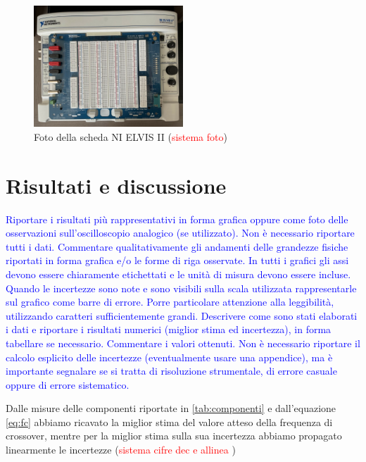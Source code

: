 \documentclass[12pt,italian]{article}
\newcommand{\prof}[1]{\textcolor{blue}{#1}}
\newcommand{\err}[1]{\textcolor{red}{#1}}
\begin{document}
\begin{figure}[h]
	\centering
	\includegraphics[width=0.5\textwidth]{Images/Elvis.jpg}
	\caption{Foto della scheda NI ELVIS II (\err{sistema foto})}
	\label{fig:Elvis}
\end{figure}

\section*{Risultati e discussione}
\prof{ Riportare i risultati più rappresentativi in forma grafica oppure come
	foto delle osservazioni sull'oscilloscopio analogico (se utilizzato). Non è
	necessario riportare tutti i dati. Commentare qualitativamente gli andamenti
	delle grandezze fisiche riportati in forma grafica e/o le forme di riga
	osservate. In tutti i grafici gli assi devono essere chiaramente etichettati e
	le unità di misura devono essere incluse. Quando le incertezze sono note e
	sono visibili sulla scala utilizzata rappresentarle sul grafico come barre di
	errore. Porre particolare attenzione alla leggibilità, utilizzando caratteri
	sufficientemente grandi. Descrivere come sono stati elaborati i dati e
	riportare i risultati numerici (miglior stima ed incertezza), in forma
	tabellare se necessario. Commentare i valori ottenuti. Non è necessario
	riportare il calcolo esplicito delle incertezze (eventualmente usare una
	appendice), ma è importante segnalare se si tratta di risoluzione strumentale,
	di errore casuale oppure di errore sistematico. }

Dalle misure delle componenti riportate in \cref{tab:componenti} e
dall'equazione \eqref{eq:fc} abbiamo ricavato la miglior
stima del valore atteso della frequenza di crossover, mentre per la miglior
stima sulla sua incertezza abbiamo propagato linearmente le incertezze
(\err{sistema cifre dec e allinea })
\end{document}

